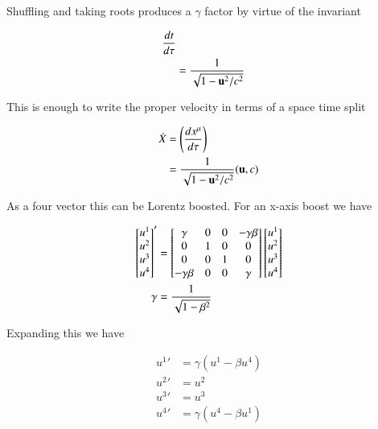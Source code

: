 \documentclass{article}
\begin{document}
Shuffling and taking roots produces a $\gamma$ factor by virtue of the invariant

\begin{align*}
\frac{dt}{d\tau} \\
&= \frac{1}{\sqrt{ 1 - \mathbf{u}^2/c^2 }}
\end{align*}

This is enough to write the proper velocity in terms of a space time split 

\begin{align*}
\dot{X} 
&= \left(\frac{dx^\mu}{d\tau}\right) \\
&= \frac{1}{\sqrt{ 1 - \mathbf{u}^2/c^2 }} (\mathbf{u}, c)
\end{align*}

As a four vector this can be Lorentz boosted.  For an 
x-axis boost we have

\begin{align*}
{\begin{bmatrix}
u^1 \\
u^2 \\
u^3 \\
u^4 \\
\end{bmatrix}}'
&=
\begin{bmatrix}
\gamma & 0 & 0 & - \gamma \beta \\
0 & 1 & 0 & 0 \\
0 & 0 & 1 & 0 \\
- \gamma \beta & 0 & 0 & \gamma \\
\end{bmatrix}
{\begin{bmatrix}
u^1 \\
u^2 \\
u^3 \\
u^4 \\
\end{bmatrix}} 
\\
\gamma &= \frac{1}{\sqrt{ 1 - \beta^2 }} \\
\end{align*}

Expanding this we have

\begin{align}\label{eqn:realRepresentationFourVector}
{u^1}' &= \gamma ( u^1 - \beta u^4) \\
{u^2}' &= {u^2} \\
{u^3}' &= {u^3} \\
{u^4}' &= \gamma ( u^4 - \beta u^1)
\end{align}
\end{document}

